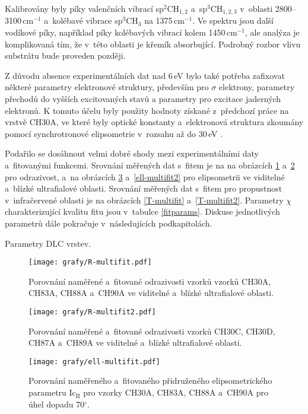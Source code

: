 Kalibrovány byly píky valenčních vibrací sp$^2$CH$_{1,2}$ a~sp$^3$CH$_{1,2,3}$ v~oblasti 2800--3100\,cm$^{-1}$ a~kolébavé vibrace sp$^3$CH$_3$ na 1375\,cm$^{-1}$. Ve spektru jsou další vodíkové píky, například píky kolébavých vibrací kolem 1450\,cm$^{-1}$, ale analýza je komplikovaná tím, že v~této oblasti je křemík absorbující. Podrobný rozbor vlivu substrátu bude proveden později.

Z důvodu absence experimentálních dat nad 6\,eV bylo také potřeba zafixovat některé parametry elektronové struktury, především pro $\sigma$ elektrony, parametry přechodů do vyšších excitovaných stavů a parametry pro excitace jaderných elektronů. K tomuto účelu byly použity hodnoty získané z~předchozí práce na vrstvě CH30A, ve které byly optické konstanty a~elektronová struktura zkoumány pomocí synchrotronové elipsometrie v~rozsahu až do 30\,eV \cite{Franta2011}.

 Podařilo se dosáhnout velmi dobré shody mezi experimentálními daty a~fitovanými funkcemi. Srovnání měřených dat s~fitem je na na obrázcích \ref{R-multifit} a~\ref{R-multifit2} pro odrazivost, a~na obrázcích \ref{ell-multifit} a~\ref{ell-multifit2} pro elipsometrii ve viditelné a~blízké ultrafialové oblasti.  Srovnání měřených dat s~fitem pro propustnost v~infračervené oblasti je na obrázcích \ref{T-multifit} a~\ref{T-multifit2}. Parametry $\chi$ charakterizující kvalitu fitu jsou v~tabulce \ref{fitparams}. Diskuse jednotlivých parametrů dále pokračuje v~následujících podkapitolách.

\begin{table}[tbhp]
 \centering
	\renewcommand{\tabcolsep}{4pt}
 
 \caption{Parametry DLC vrstev.}
\label{fitparams}
\end{table}

\begin{figure}[htp]
	\texttt{[image: grafy/R-multifit.pdf]}
	\caption{Porovnání naměřené a~fitované odrazivosti vzorků vzorků CH30A, CH83A, CH88A a~CH90A ve viditelné a~blízké ultrafialové oblasti.}
	\label{R-multifit}
\end{figure}

\begin{figure}[htp]
	\texttt{[image: grafy/R-multifit2.pdf]}
	\caption{Porovnání naměřené a~fitované odrazivosti vzorků CH30C, CH30D, CH87A a~CH89A ve viditelné a~blízké ultrafialové oblasti.}
	\label{R-multifit2}
\end{figure}

\begin{figure}[htp]
	\texttt{[image: grafy/ell-multifit.pdf]}
	\caption{Porovnání naměřeného a~fitovaného přidruženého elipsometrického parametru Ic$_{\mathrm{II}}$ pro vzorky CH30A, CH83A, CH88A a~CH90A pro úhel dopadu 70$^\circ$.}
	\label{ell-multifit}
\end{figure}

